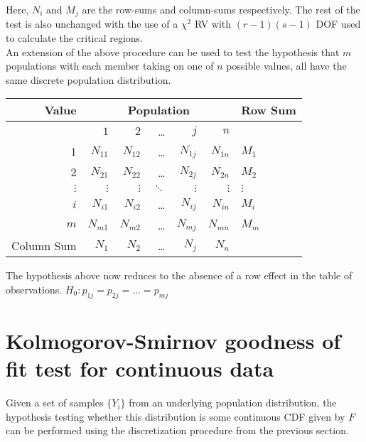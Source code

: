 Here, $ N_i $ and $ M_j $ are the row-sums and column-sums respectively. The rest of the test is also unchanged with the use of a $ \chi^2 $ RV with $ (r-1)(s-1) $ DOF used to calculate the critical regions.\\


An extension of the above procedure can be used to test the hypothesis that $ m $ populations with each member taking on one of $ n $ possible values, all have the same discrete population distribution.\\

\begin{table}[H]
	\renewcommand{\arraystretch}{2}
	\centering
	\begin{tabular}{@{}rrrrrr|l@{}}
		\toprule
		Value 	& \multicolumn{5}{c}{Population}	& Row Sum\\ 
		\midrule
		{} & $ 1 $	& $ 2 $	& \dots & $ j $ & $ n $ & {} \\
		\midrule
		$ 1 $ & $ N_{11} $ & $ N_{12} $ & \dots &  $ N_{1j} $ & $ N_{1n} $ & $ M_{1} $ \\
		$ 2 $ & $ N_{21} $ & $ N_{22} $ & \dots &  $ N_{2j} $ & $ N_{2n} $ & $ M_{2} $ \\
		$ \vdots $ & $ \vdots $ & $ \vdots $ & $ \ddots $ &  $ \vdots $ & $ \vdots $ & $ \vdots $ \\
		$ i $ & $ N_{i1} $ & $ N_{i2} $ & \dots &  $ N_{ij} $ & $ N_{in} $ & $ M_{i} $ \\
		$ m $ & $ N_{m1} $ & $ N_{m2} $ & \dots &  $ N_{mj} $ & $ N_{mn} $ & $ M_{m} $ \\
		\midrule
		Column Sum & $ N_1 $ & $ N_2 $ & \dots &  $ N_j $ & $ N_n $ & {} \\ 
		\bottomrule
	\end{tabular}
	
	\bigskip
\end{table}

The hypothesis above now reduces to the absence of a row effect in the table of observations. $ H_0 : p_{1j}  = p_{2j} = \dots  = p_{mj}$\\

\section{Kolmogorov-Smirnov goodness of fit test for continuous data}

Given a set of samples $ \{Y_i\} $ from an underlying population distribution, the hypothesis testing whether this distribution is some continuous CDF given by $ F $ can be performed using the discretization procedure from the previous section.\\

